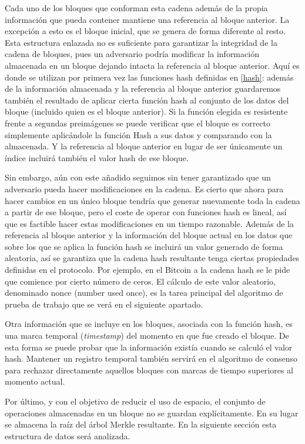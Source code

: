 Cada uno de los bloques que conforman esta cadena además de la propia información que pueda contener mantiene una referencia al bloque anterior. La excepción a esto es el bloque inicial, que se genera de forma diferente al resto.
Esta estructura enlazada no es suficiente para garantizar la integridad de la cadena de bloques, pues un adversario podría modificar la información almacenada en un bloque dejando intacta la referencia al bloque anterior. Aquí es donde se utilizan por primera vez las funciones hash definidas en \ref{hash}: además de la información almacenada y la referencia al bloque anterior guardaremos también el resultado de aplicar cierta función hash al conjunto de los datos del bloque (incluido quien es el bloque anterior). Si la función elegida es resistente frente a segundas preimágenes se puede verificar que  el bloque es correcto simplemente aplicándole la función Hash a sus datos y comparando con la almacenada. Y la referencia al bloque anterior en lugar de ser únicamente un índice incluirá también el valor hash de ese bloque.

Sin embargo, aún con este añadido seguimos sin tener garantizado que un adversario pueda hacer modificaciones en la cadena. Es cierto que ahora para hacer cambios en un único bloque tendría que generar nuevamente toda la cadena a partir de ese bloque, pero el coste de operar con funciones hash es lineal, así que es factible hacer estas modificaciones en un tiempo razonable. Además de la referencia al bloque anterior y la información del bloque actual en los datos que sobre los que se aplica la función hash se incluirá un valor generado de forma aleatoria, así se garantiza que la cadena hash resultante tenga ciertas propiedades definidas en el protocolo. Por ejemplo, en el Bitcoin a la cadena hash se le pide que comience por cierto número de ceros. El cálculo de este valor aleatorio, denominado nonce (number used once), es la tarea principal del algoritmo de prueba de trabajo que se verá en el siguiente apartado.

Otra información que se incluye en los bloques, asociada con la función hash, es una marca temporal (\textit{timestamp}) del momento en que fue creado el bloque. De esta forma se puede probar que la información existía cuando se calculó el valor hash. Mantener un registro temporal también servirá en el algoritmo de consenso para rechazar directamente aquellos bloques con marcas de tiempo superiores al momento actual.

Por último, y con el objetivo de reducir el uso de espacio, el conjunto de operaciones almacenadas en un bloque no se guardan explícitamente. En su lugar se almacena la raíz del árbol Merkle resultante. En la siguiente sección esta estructura de datos será analizada.

